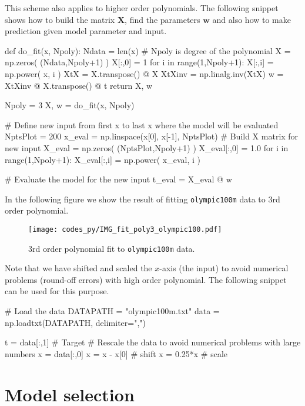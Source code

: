 \documentclass[b5paper,12pt]{article} %
\newcommand{\txtinline}[1]{\texttt{#1}}
\begin{document}
This scheme also applies to higher order polynomials. The following snippet shows
how to build the matrix $\mathbf{X}$, find the parameters $\mathbf{w}$ and
also how to make prediction given model parameter and input.
\begin{pythoncode}
def do_fit(x, Npoly):
  Ndata = len(x)
  # Npoly is degree of the polynomial
  X = np.zeros( (Ndata,Npoly+1) )
  X[:,0] = 1
  for i in range(1,Npoly+1):
      X[:,i] = np.power( x, i )
  XtX = X.transpose() @ X
  XtXinv = np.linalg.inv(XtX)
  w = XtXinv @ X.transpose() @ t
  return X, w

Npoly = 3
X, w = do_fit(x, Npoly)

# Define new input from first x to last x where the model will be evaluated
NptsPlot = 200
x_eval = np.linspace(x[0], x[-1], NptsPlot)
# Build X matrix for new input
X_eval = np.zeros( (NptsPlot,Npoly+1) )
X_eval[:,0] = 1.0
for i in range(1,Npoly+1):
    X_eval[:,i] = np.power( x_eval, i )

# Evaluate the model for the new input  
t_eval = X_eval @ w
\end{pythoncode}

In the following figure we show the result of fitting \txtinline{olympic100m} data
to 3rd order polynomial.
\begin{figure}[H]
\begin{center}
\texttt{[image: codes\_py/IMG\_fit\_poly3\_olympic100.pdf]}
\end{center}
\caption{3rd order polynomial fit to \txtinline{olympic100m} data.}
\end{figure}

Note that we have shifted and scaled the $x$-axis (the input) to avoid
numerical problems (round-off errors) with high order polynomial.
The following snippet can be used for this purpose.
\begin{pythoncode}
# Load the data
DATAPATH = "olympic100m.txt"
data = np.loadtxt(DATAPATH, delimiter=",")

t = data[:,1] # Target
# Rescale the data to avoid numerical problems with large numbers
x = data[:,0]
x = x - x[0] # shift
x = 0.25*x # scale
\end{pythoncode}


\section{Model selection}
\end{document}
